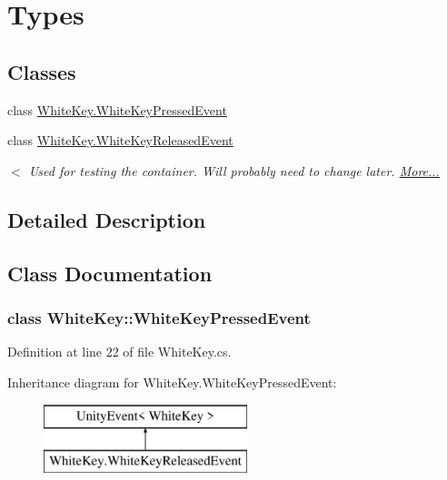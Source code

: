 \hypertarget{group___white_key_types}{}\section{Types}
\label{group___white_key_types}
\subsection*{Classes}
\begin{DoxyCompactItemize}
\item 
class \hyperlink{group___white_key_types_class_white_key_1_1_white_key_pressed_event}{White\+Key.\+White\+Key\+Pressed\+Event}
\item 
class \hyperlink{group___white_key_types_class_white_key_1_1_white_key_released_event}{White\+Key.\+White\+Key\+Released\+Event}
\begin{DoxyCompactList}\small\item\em $<$ Used for testing the container. Will probably need to change later.  \hyperlink{group___white_key_types_class_white_key_1_1_white_key_released_event}{More...}\end{DoxyCompactList}\end{DoxyCompactItemize}


\subsection{Detailed Description}


\subsection{Class Documentation}
\label{class_white_key_1_1_white_key_pressed_event}
\subsubsection{class White\+Key\+:\+:White\+Key\+Pressed\+Event}


Definition at line 22 of file White\+Key.\+cs.

Inheritance diagram for White\+Key.\+White\+Key\+Pressed\+Event\+:\begin{figure}[H]
\begin{center}
\leavevmode
\includegraphics[height=2.000000cm]{group___white_key_types}
\end{center}
\end{figure}
\label{class_white_key_1_1_white_key_released_event}
